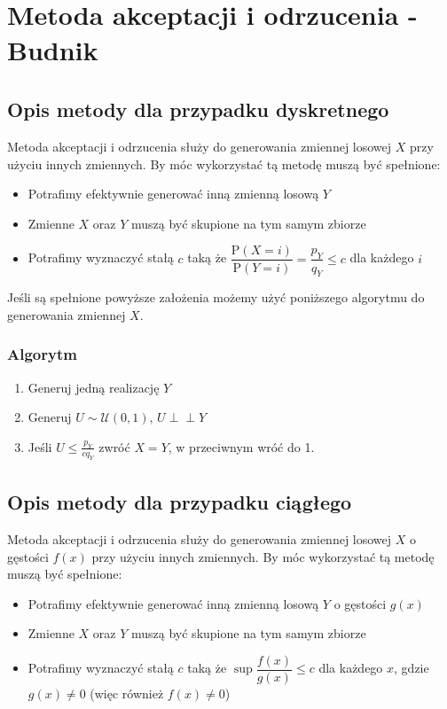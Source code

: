 \documentclass[12pt]{mwrep}
\newcommand{\indep}{\perp \!\!\! \perp}
\begin{document}

	
	\section{Metoda akceptacji i odrzucenia\textsuperscript{\cite{AO - dyskretny}} - Budnik}
	\subsection{Opis metody dla przypadku dyskretnego\textsuperscript{\cite{AO - dyskretny}}}
	\noindent Metoda akceptacji i odrzucenia służy do generowania zmiennej losowej $X$ przy użyciu innych zmiennych. By móc wykorzystać tą metodę muszą być spełnione:
	\begin{itemize}[leftmargin=10mm]
		\item Potrafimy efektywnie generować inną zmienną losową $Y$
		\item Zmienne $X$ oraz $Y$ muszą być skupione na tym samym zbiorze
		\item Potrafimy wyznaczyć stałą $c$ taką że $\dfrac{\mathrm{P}(X=i)}{\mathrm{P}(Y=i)}=\dfrac{p_Y}{q_Y}\leqslant c$ dla każdego $i$
	\end{itemize}
	Jeśli są spełnione powyższe założenia możemy użyć poniższego algorytmu do generowania zmiennej $X$.
	\subsubsection{Algorytm}
	\begin{enumerate}[leftmargin=10mm]
		\item Generuj jedną realizację $Y$
		\item Generuj $U\sim \mathcal{U}(0,1)$, $U\indep Y$
		\item Jeśli $U\leqslant\frac{p_Y}{cq_Y}$ zwróć $X=Y$, w przeciwnym wróć do 1.
	\end{enumerate}
	
	
	\subsection{Opis metody dla przypadku ciągłego\textsuperscript{\cite{AO - ciagly}}}
	M\noindent etoda akceptacji i odrzucenia służy do generowania zmiennej losowej $X$ o gęstości $f(x)$ przy użyciu innych zmiennych. By móc wykorzystać tą metodę muszą być spełnione:
	\begin{itemize}[leftmargin=10mm]
		\item Potrafimy efektywnie generować inną zmienną losową $Y$ o gęstości $g(x)$
		\item Zmienne $X$ oraz $Y$ muszą być skupione na tym samym zbiorze
		\item Potrafimy wyznaczyć stałą $c$ taką że $\sup\dfrac{f(x)}{g(x)}\leqslant c$ dla każdego $x$, gdzie $g(x)\neq0$ (więc również $f(x)\neq0$)
	\end{itemize}
\end{document}
